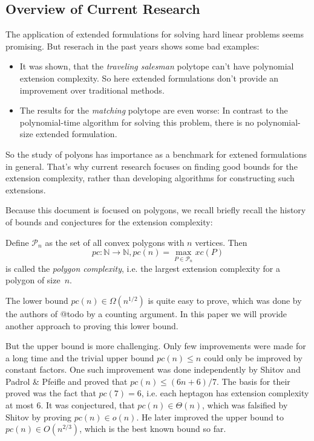 \subsection{Overview of Current Research}
The application of extended formulations for solving hard linear problems seems promising. But reserach in the past years shows some bad examples:
\begin{itemize}
  \item It was shown, that the \textit{traveling salesman} polytope can't have polynomial extension complexity. So here extended formulations don't provide an improvement over traditional methods.
  \item The results for the \textit{matching} polytope are even worse: In contrast to the polynomial-time algorithm for solving this problem, there is no polynomial-size extended formulation.
\end{itemize}
So the study of polyons has importance as a benchmark for extened formulations in general.
That's why current research focuses on finding good bounds for the extension complexity, rather than developing algorithms for constructing such extensions.


Because this document is focused on polygons, we recall briefly recall the history of bounds and conjectures for the extension complexity:

Define $\mathcal{P}_n$ as the set of all convex polygons with $n$ vertices. Then $$pc:\mathbb{N} \to \mathbb{N}, pc(n) = \max_{P \in \mathcal{P}_n} xc(P)$$ is called the \textit{polygon complexity}, i.e. the largest extension complexity for a polygon of size~$n$.

The lower bound $pc(n) \in \Omega(n^{1/2})$ is quite easy to prove, which was done by the authors of @todo by a counting argument. In this paper we will provide another approach to proving this lower bound. 

But the upper bound is more challenging. Only few improvements were made for a long time and the trivial upper bound $pc(n) \leq n$ could only be improved by constant factors. One such improvement was done independently by Shitov and Padrol \& Pfeifle and proved that $pc(n) \leq (6n+6)/7$. The basis for their proved was the fact that $pc(7)=6$, i.e. each heptagon has extension complexity at most 6.
It was conjectured, that $pc(n) \in \Theta(n)$, which was falsified by Shitov by proving $pc(n) \in o(n)$. He later improved the upper bound to $pc(n) \in O(n^{2/3})$, which is the best known bound so far.

